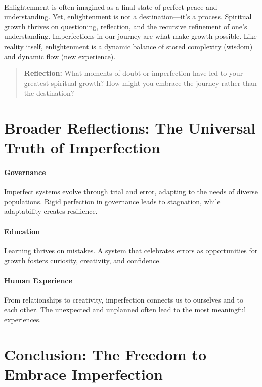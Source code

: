 \documentclass[12pt]{article}
\begin{document}
\paragraph{}
Enlightenment is often imagined as a final state of perfect peace and understanding. Yet, enlightenment is not a destination—it’s a process. Spiritual growth thrives on questioning, reflection, and the recursive refinement of one’s understanding. Imperfections in our journey are what make growth possible. Like reality itself, enlightenment is a dynamic balance of stored complexity (wisdom) and dynamic flow (new experience).

\begin{quote}
\textbf{Reflection:}  
What moments of doubt or imperfection have led to your greatest spiritual growth? How might you embrace the journey rather than the destination?
\end{quote}

\section*{Broader Reflections: The Universal Truth of Imperfection}

\paragraph{Governance} Imperfect systems evolve through trial and error, adapting to the needs of diverse populations. Rigid perfection in governance leads to stagnation, while adaptability creates resilience.

\paragraph{Education} Learning thrives on mistakes. A system that celebrates errors as opportunities for growth fosters curiosity, creativity, and confidence.

\paragraph{Human Experience} From relationships to creativity, imperfection connects us to ourselves and to each other. The unexpected and unplanned often lead to the most meaningful experiences.

\section*{Conclusion: The Freedom to Embrace Imperfection}
\end{document}
